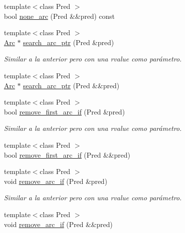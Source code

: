 \begin{DoxyCompactItemize}
{\footnotesize template$<$class Pred $>$ }\\bool \hyperlink{class_designar_1_1_base_graph_a69c4841b8c517a510d738bc1204da7b7}{none\+\_\+arc} (Pred \&\&pred) const
\item 
{\footnotesize template$<$class Pred $>$ }\\\hyperlink{namespace_designar_a3f55fb5513d62ff47cbc8f72b8e95d6f}{Arc} $\ast$ \hyperlink{class_designar_1_1_base_graph_afcbc602350567bc5a377fd7fc94419ae}{search\+\_\+arc\+\_\+ptr} (Pred \&pred)
\begin{DoxyCompactList}\small\item\em Similar a la anterior pero con una rvalue como parámetro. \end{DoxyCompactList}\item 
{\footnotesize template$<$class Pred $>$ }\\\hyperlink{namespace_designar_a3f55fb5513d62ff47cbc8f72b8e95d6f}{Arc} $\ast$ \hyperlink{class_designar_1_1_base_graph_a4ffe61f2548a892d070aa46609c4532c}{search\+\_\+arc\+\_\+ptr} (Pred \&\&pred)
\item 
{\footnotesize template$<$class Pred $>$ }\\bool \hyperlink{class_designar_1_1_base_graph_ae45255ef62c056e76c5e5c45182e9490}{remove\+\_\+first\+\_\+arc\+\_\+if} (Pred \&pred)
\begin{DoxyCompactList}\small\item\em Similar a la anterior pero con una rvalue como parámetro. \end{DoxyCompactList}\item 
{\footnotesize template$<$class Pred $>$ }\\bool \hyperlink{class_designar_1_1_base_graph_a990426c9e87f922bbbd0c9bc4d2cedd8}{remove\+\_\+first\+\_\+arc\+\_\+if} (Pred \&\&pred)
\item 
{\footnotesize template$<$class Pred $>$ }\\void \hyperlink{class_designar_1_1_base_graph_a9c97f2759a2847e61e17dc2806172758}{remove\+\_\+arc\+\_\+if} (Pred \&pred)
\begin{DoxyCompactList}\small\item\em Similar a la anterior pero con una rvalue como parámetro. \end{DoxyCompactList}\item 
{\footnotesize template$<$class Pred $>$ }\\void \hyperlink{class_designar_1_1_base_graph_a0e516bee6e0247de6bdd207de57caad6}{remove\+\_\+arc\+\_\+if} (Pred \&\&pred)
\item 

\end{DoxyCompactItemize}
